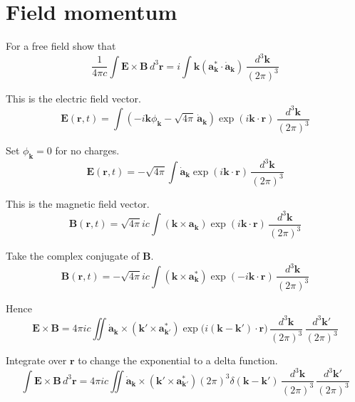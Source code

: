 


\section*{Field momentum}

For a free field show that
\begin{equation*}
\frac{1}{4\pi c}\int\mathbf E\times\mathbf B\,d^3\mathbf r
=i\int\mathbf k\left(\mathbf a_{\mathbf k}^*\cdot\dot{\mathbf a}_{\mathbf k}\right)\,
\frac{d^3\mathbf k}{(2\pi)^3}
\end{equation*}

This is the electric field vector.
\begin{equation*}
\mathbf E(\mathbf r,t)
=\int\left(-i\mathbf k\phi_{\mathbf k}-\sqrt{4\pi}\,\dot{\mathbf a}_{\mathbf k}\right)
\exp(i\mathbf k\cdot\mathbf r)\,
\frac{d^3\mathbf k}{(2\pi)^3}
\end{equation*}

Set $\phi_{\mathbf k}=0$ for no charges.
\begin{equation*}
\mathbf E(\mathbf r,t)
=-\sqrt{4\pi}\int\dot{\mathbf a}_{\mathbf k}
\exp(i\mathbf k\cdot\mathbf r)\,
\frac{d^3\mathbf k}{(2\pi)^3}
\end{equation*}

This is the magnetic field vector.
\begin{equation*}
\mathbf B(\mathbf r,t)
=\sqrt{4\pi}ic\int(\mathbf k\times\mathbf a_{\mathbf k})
\exp(i\mathbf k\cdot\mathbf r)\,
\frac{d^3\mathbf k}{(2\pi)^3}
\end{equation*}

Take the complex conjugate of $\mathbf B$.
\begin{equation*}
\mathbf B(\mathbf r,t)
=-\sqrt{4\pi}ic\int(\mathbf k\times\mathbf a_{\mathbf k}^*)
\exp(-i\mathbf k\cdot\mathbf r)\,
\frac{d^3\mathbf k}{(2\pi)^3}
\end{equation*}

Hence
\begin{equation*}
\mathbf E\times\mathbf B
=4\pi ic\iint\dot{\mathbf a}_{\mathbf k}\times(\mathbf k'\times\mathbf a_{\mathbf k'}^*)
\exp\bigl(i(\mathbf k-\mathbf k')\cdot\mathbf r\bigr)
\,\frac{d^3\mathbf k}{(2\pi)^3}\,\frac{d^3\mathbf k'}{(2\pi)^3}
\end{equation*}

Integrate over $\mathbf r$ to change the exponential to a delta function.
\begin{equation*}
\int\mathbf E\times\mathbf B\,d^3\mathbf r
=4\pi ic\iint\dot{\mathbf a}_{\mathbf k}\times(\mathbf k'\times\mathbf a_{\mathbf k'}^*)
(2\pi)^3\delta(\mathbf k-\mathbf k')
\,\frac{d^3\mathbf k}{(2\pi)^3}\,\frac{d^3\mathbf k'}{(2\pi)^3}
\end{equation*}

